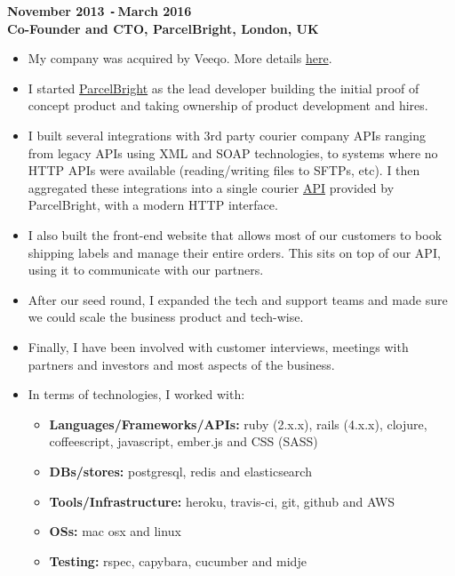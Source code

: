 \documentclass{res}
\def\Minus{\texttt{-}\,}
\begin{document}
\begin{resume}
  {\bf November 2013 \Minus March 2016}\\
  {\bf Co-Founder and CTO, ParcelBright, London, UK}
    \begin{itemize}
      \item[] My company was acquired by Veeqo. More details
        \href{https://techcrunch.com/2016/03/08/the-final-delivery/}{here}.
      \item[] I started \href{https://www.parcelbright.com/}{ParcelBright} as
        the lead developer building the initial proof of concept product and
        taking ownership of product development and hires.
      \item[] I built several integrations with 3rd party courier company
        APIs ranging from legacy APIs using XML and SOAP technologies, to
        systems where no HTTP APIs were available (reading/writing files to
        SFTPs, etc). I then aggregated these integrations into a single
        courier \href{https://github.com/parcelbright/api-docs}{API} provided by
        ParcelBright, with a modern HTTP interface.
      \item[] I also built the front-end website that allows most of our
        customers to book shipping labels and manage their entire orders. This
        sits on top of our API, using it to communicate with our partners.
      \item[] After our seed round, I expanded the tech and support teams
        and made sure we could scale the business product and tech-wise.
      \item[] Finally, I have been involved with customer interviews, meetings
        with partners and investors and most aspects of the business.
      \item[] In terms of technologies, I worked with:
      \begin{itemize}
        \item[] {\bf Languages/Frameworks/APIs:} ruby (2.x.x), rails
          (4.x.x), clojure, coffeescript, javascript, ember.js and CSS (SASS)
        \item[] {\bf DBs/stores:} postgresql, redis and elasticsearch
        \item[] {\bf Tools/Infrastructure:} heroku, travis-ci, git, github and
          AWS
        \item[] {\bf OSs:} mac osx and linux
        \item[] {\bf Testing:} rspec, capybara, cucumber and midje
      \end{itemize}
    \end{itemize}


\end{resume}
\end{document}
